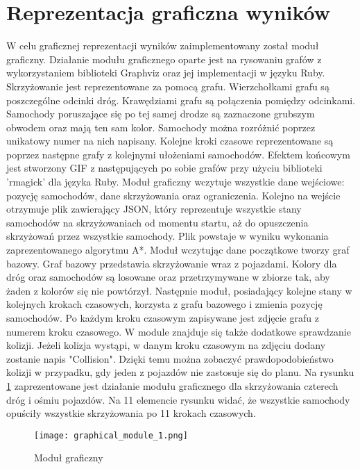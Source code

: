 \section{Reprezentacja graficzna wyników}

W celu graficznej reprezentacji wyników zaimplementowany został moduł graficzny. Działanie modułu graficznego oparte jest na rysowaniu grafów z wykorzystaniem biblioteki Graphviz oraz jej implementacji w języku Ruby. Skrzyżowanie jest reprezentowane za pomocą grafu. Wierzchołkami grafu są poszczególne odcinki dróg. Krawędziami grafu są połączenia pomiędzy odcinkami. Samochody poruszające się po tej samej drodze są zaznaczone grubszym obwodem oraz mają ten sam kolor. Samochody można rozróżnić poprzez unikatowy numer na nich napisany. Kolejne kroki czasowe reprezentowane są poprzez następne grafy z kolejnymi ułożeniami samochodów. Efektem końcowym jest stworzony GIF z następujących po sobie grafów przy użyciu biblioteki 'rmagick' dla języka Ruby.
\newline
\indent
Moduł graficzny wczytuje wszystkie dane wejściowe: pozycję samochodów, dane skrzyżowania oraz ograniczenia. Kolejno na wejście otrzymuje plik zawierający JSON, który reprezentuje wszystkie stany samochodów na skrzyżowaniach od momentu startu, aż do opuszczenia skrzyżowań przez wszystkie samochody. Plik powstaje w wyniku wykonania zaprezentowanego algorytmu A*. Moduł wczytując dane początkowe tworzy graf bazowy. Graf bazowy przedstawia skrzyżowanie wraz z pojazdami. Kolory dla dróg oraz samochodów są losowane oraz przetrzymywane w zbiorze tak, aby żaden z kolorów się nie powtórzył. Następnie moduł, posiadający kolejne stany w kolejnych krokach czasowych, korzysta z grafu bazowego i zmienia pozycję samochodów. Po każdym kroku czasowym zapisywane jest zdjęcie grafu z numerem kroku czasowego.
\newline
\indent
W module znajduje się także dodatkowe sprawdzanie kolizji. Jeżeli kolizja wystąpi, w danym kroku czasowym na zdjęciu dodany zostanie napis "Collision". Dzięki temu można zobaczyć prawdopodobieństwo kolizji w przypadku, gdy jeden z pojazdów nie zastosuje się do planu.
\newline
\indent
Na rysunku \ref{graphical-framework} zaprezentowane jest działanie modułu graficznego dla skrzyżowania czterech dróg i ośmiu pojazdów. Na 11 elemencie rysunku widać, że wszystkie samochody opuściły wszystkie skrzyżowania po 11 krokach czasowych.
\begin{figure}
    \texttt{[image: graphical\_module\_1.png]}
  \caption{Moduł graficzny}
  \label{graphical-framework}
\end{figure}
\newpage
